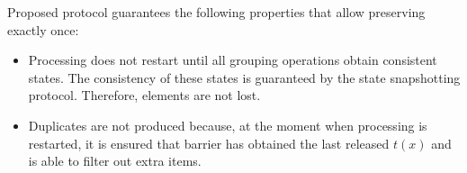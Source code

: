 Proposed protocol guarantees the following properties that allow preserving exactly once:

\begin{itemize}
    \item Processing does not restart until all grouping operations obtain consistent states. The consistency of these states is guaranteed by the state snapshotting protocol. Therefore, elements are not lost.
    \item Duplicates are not produced because, at the moment when processing is restarted, it is ensured that barrier has obtained the last released $t(x)$ and is able to filter out extra items.
\end{itemize}